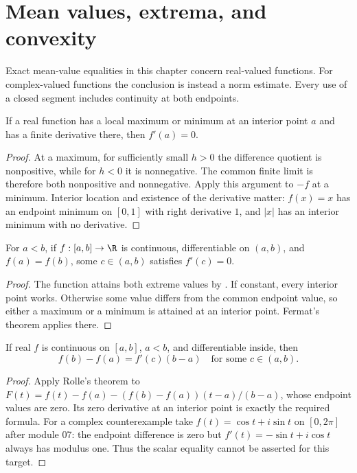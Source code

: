 \chapter{Mean values, extrema, and convexity}
Exact mean-value equalities in this chapter concern real-valued functions. For complex-valued functions the conclusion is instead a norm estimate. Every use of a closed segment includes continuity at both endpoints.

\begin{theorem}
If a real function has a local maximum or minimum at an interior point $a$ and has a finite derivative there, then $f'(a)=0$.
\end{theorem}
\begin{proof}
At a maximum, for sufficiently small $h>0$ the difference quotient is nonpositive, while for $h<0$ it is nonnegative. The common finite limit is therefore both nonpositive and nonnegative. Apply this argument to $-f$ at a minimum. Interior location and existence of the derivative matter: $f(x)=x$ has an endpoint minimum on $[0,1]$ with right derivative $1$, and $|x|$ has an interior minimum with no derivative.
\end{proof}

\begin{theorem}
For $a<b$, if $f:[a,b]\to\R$ is continuous, differentiable on $(a,b)$, and $f(a)=f(b)$, some $c\in(a,b)$ satisfies $f'(c)=0$.
\end{theorem}
\begin{proof}
The function attains both extreme values by . If constant, every interior point works. Otherwise some value differs from the common endpoint value, so either a maximum or a minimum is attained at an interior point. Fermat's theorem applies there.
\end{proof}

\begin{theorem}
If real $f$ is continuous on $[a,b]$, $a<b$, and differentiable inside, then
\[ f(b)-f(a)=f'(c)(b-a)\quad\text{for some }c\in(a,b). \]
\end{theorem}
\begin{proof}
Apply Rolle's theorem to $F(t)=f(t)-f(a)-(f(b)-f(a))(t-a)/(b-a)$, whose endpoint values are zero. Its zero derivative at an interior point is exactly the required formula. For a complex counterexample take $f(t)=\cos t+i\sin t$ on $[0,2\pi]$ after module 07: the endpoint difference is zero but $f'(t)=-\sin t+i\cos t$ always has modulus one. Thus the scalar equality cannot be asserted for this target.
\end{proof}

